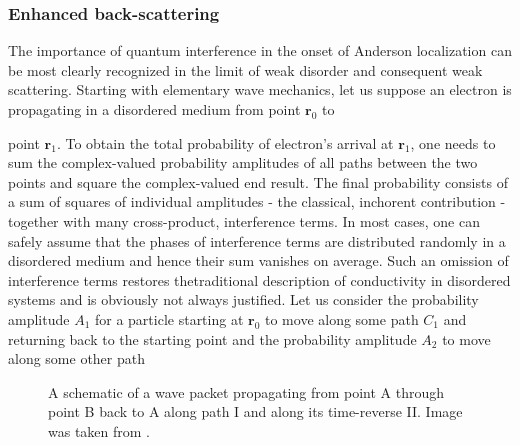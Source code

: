 \documentclass[10pt,a4paper]{article}
\begin{document}
\subsubsection{Enhanced back-scattering }
The importance of quantum interference in the onset of Anderson localization can be most clearly recognized in the limit of weak disorder and consequent weak scattering. Starting with elementary wave mechanics, let us suppose an electron is propagating in a disordered medium from point $\mathbf{r}_0$ to 
\begin{minipage}[t]{0.58\textwidth} 
point $\mathbf{r}_1$. To obtain the total probability of electron's arrival at $\mathbf{r}_1$, one needs to sum the complex-valued probability amplitudes of all paths between the two points and square the complex-valued end result. The final probability consists of a sum of squares of individual amplitudes - the classical, inchorent contribution - together with many cross-product, interference terms. In most cases, one can safely assume that the phases of interference terms are distributed randomly in a disordered medium and hence their sum vanishes on average. Such an omission of interference terms restores thetraditional description of conductivity in disordered systems and is obviously not always justified. Let us consider the probability amplitude $A_1$ for a particle starting at $\mathbf{r}_0$ to move along some path $C_1$ and returning back to the starting point and the probability amplitude $A_2$ to move along some other path
\end{minipage}\hfill
\begin{minipage}[t]{0.39\textwidth}
\begin{figure}[H]
\caption{A schematic of a wave packet propagating from point A through point B back to A along path I and along its time-reverse II. Image was taken from \cite{50yearsof}.}
\label{fig:paths} 
\end{figure}
\end{minipage}
\end{document}
